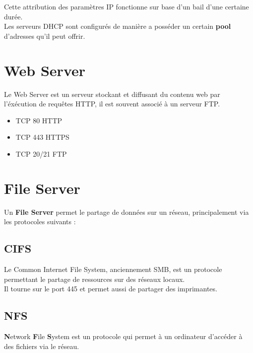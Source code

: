 \documentclass{report}
\begin{document}
		Cette attribution des paramètres IP fonctionne sur base d'un bail d'une certaine durée.\\

		Les serveurs DHCP sont configurés de manière a posséder un certain \textbf{pool} d'adresses qu'il peut offrir.\\

	\section{Web Server}

		Le Web Server est un serveur stockant et diffusant du contenu web par l'éxécution de requêtes HTTP, il est souvent associé à un serveur FTP.\\

		\begin{itemize}
			\item TCP 80 HTTP
			\item TCP 443 HTTPS
			\item TCP 20/21 FTP\\
		\end{itemize}

	\section{File Server}

		Un \textbf{File Server} permet le partage de données sur un réseau, principalement via les protocoles suivants : \\

		\subsection{CIFS}

			Le Common Internet File System, anciennement SMB, est un protocole permettant le partage de ressources sur des réseaux locaux.\\

			Il tourne sur le port 445 et permet aussi de partager des imprimantes.\\

		\subsection{NFS}

			\textbf{N}etwork \textbf{F}ile \textbf{S}ystem est un protocole qui permet à un ordinateur d'accéder à des fichiers via le réseau.\\
\end{document}
